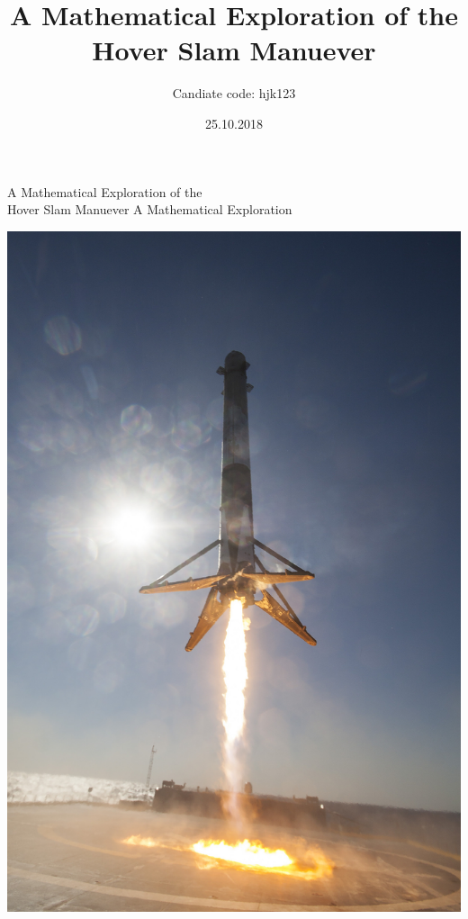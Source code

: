 \documentclass[12pt]{article}
\begin{document}
    \title{A Mathematical Exploration of the Hover Slam Manuever}
    \date{25.10.2018}
    \author{Candiate code: hjk123}
    \begin{titlepage}
        \begin{center}
            \Huge{A Mathematical Exploration of the \\ Hover Slam Manuever}
            \break
            {\large A Mathematical Exploration}
            \break
            

            \vspace{12mm}
            \includegraphics[scale=0.18]{hoverslam2.jpg}
            

        \end{center}
    \end{titlepage}
\end{document}
